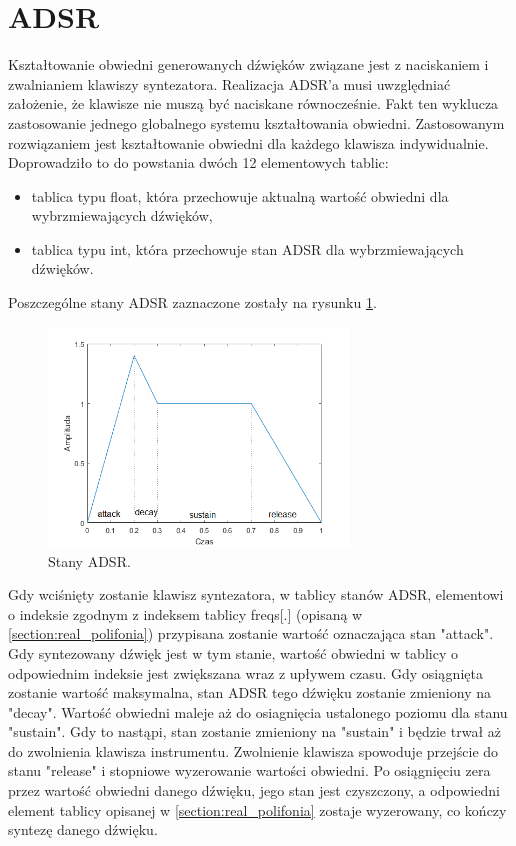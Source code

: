 \section{ADSR}\label{sec:real_adsr}
Kształtowanie obwiedni generowanych dźwięków związane jest z naciskaniem i zwalnianiem klawiszy syntezatora. Realizacja ADSR'a musi uwzględniać założenie, że klawisze nie muszą być naciskane równocześnie. Fakt ten wyklucza zastosowanie jednego globalnego systemu kształtowania obwiedni. Zastosowanym rozwiązaniem jest kształtowanie obwiedni dla każdego klawisza indywidualnie. Doprowadziło to do powstania dwóch 12 elementowych tablic:
\begin{itemize}
	\item tablica typu float, która przechowuje aktualną wartość obwiedni dla wybrzmiewających dźwięków,
	\item tablica typu int, która przechowuje stan ADSR dla wybrzmiewających dźwięków.
\end{itemize}
Poszczególne stany ADSR zaznaczone zostały na rysunku \ref{rys:real_adsr}.
\begin{figure}[H]
	\centering
	\includegraphics[width=8cm]{./grafiki/real_adsr}
	\captionsetup{justification=centering}
	\caption{Stany ADSR.}
	\label{rys:real_adsr}
\end{figure}
Gdy wciśnięty zostanie klawisz syntezatora, w tablicy stanów ADSR, elementowi o indeksie zgodnym z indeksem tablicy freqs[.] (opisaną w \ref{section:real_polifonia}) przypisana zostanie wartość oznaczająca stan "attack". Gdy syntezowany dźwięk jest w tym stanie, wartość obwiedni w tablicy o odpowiednim indeksie jest zwiększana wraz z upływem czasu. Gdy osiągnięta zostanie wartość maksymalna, stan ADSR tego dźwięku zostanie zmieniony na "decay". Wartość obwiedni maleje aż do osiagnięcia ustalonego poziomu dla stanu "sustain". Gdy to nastąpi, stan zostanie zmieniony na "sustain" i będzie trwał aż do zwolnienia klawisza instrumentu. Zwolnienie klawisza spowoduje przejście do stanu "release" i stopniowe wyzerowanie wartości obwiedni. Po osiągnięciu zera przez wartość obwiedni danego dźwięku, jego stan jest czyszczony, a odpowiedni element tablicy opisanej w \ref{section:real_polifonia} zostaje wyzerowany, co kończy syntezę danego dźwięku.

